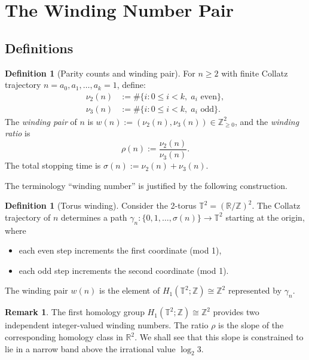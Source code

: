 \documentclass[11pt,a4paper]{article}
\newcommand{\Z}{\mathbb{Z}}
\newcommand{\R}{\mathbb{R}}
\newcommand{\T}{\mathbb{T}}
\theoremstyle{plain}
\theoremstyle{definition}
\newtheorem{definition}[theorem]{Definition}
\newtheorem{remark}[theorem]{Remark}
\begin{document}
\section{The Winding Number Pair}\label{sec:winding}

\subsection{Definitions}

\begin{definition}[Parity counts and winding pair]\label{def:winding-pair}
    For $n \geq 2$ with finite Collatz trajectory $n = a_0, a_1, \ldots, a_k = 1$, define:
    \begin{align}
        \nu_2(n) &:= \#\{i : 0 \leq i < k,\; a_i \text{ even}\}, \label{eq:nu2}\\
        \nu_3(n) &:= \#\{i : 0 \leq i < k,\; a_i \text{ odd}\}. \label{eq:nu3}
    \end{align}
    The \emph{winding pair} of $n$ is $w(n) := (\nu_2(n), \nu_3(n)) \in \Z_{\geq 0}^2$, and the \emph{winding ratio} is
    \begin{equation}\label{eq:rho}
        \rho(n) := \frac{\nu_2(n)}{\nu_3(n)}.
    \end{equation}
    The total stopping time is $\sigma(n) := \nu_2(n) + \nu_3(n)$.
\end{definition}

The terminology ``winding number'' is justified by the following construction.

\begin{definition}[Torus winding]\label{def:torus-winding}
    Consider the 2-torus $\T^2 = (\R/\Z)^2$. The Collatz trajectory of $n$ determines a path $\gamma_n: \{0, 1, \ldots, \sigma(n)\} \to \T^2$ starting at the origin, where
    \begin{itemize}
        \item each even step increments the first coordinate (mod 1),
        \item each odd step increments the second coordinate (mod 1).
    \end{itemize}
    The winding pair $w(n)$ is the element of $H_1(\T^2;\Z) \cong \Z^2$ represented by $\gamma_n$.
\end{definition}

\begin{remark}
    The first homology group $H_1(\T^2;\Z) \cong \Z^2$ provides two independent integer-valued winding numbers. The ratio $\rho$ is the slope of the corresponding homology class in $\R^2$. We shall see that this slope is constrained to lie in a narrow band above the irrational value $\log_2 3$.
\end{remark}
\end{document}
